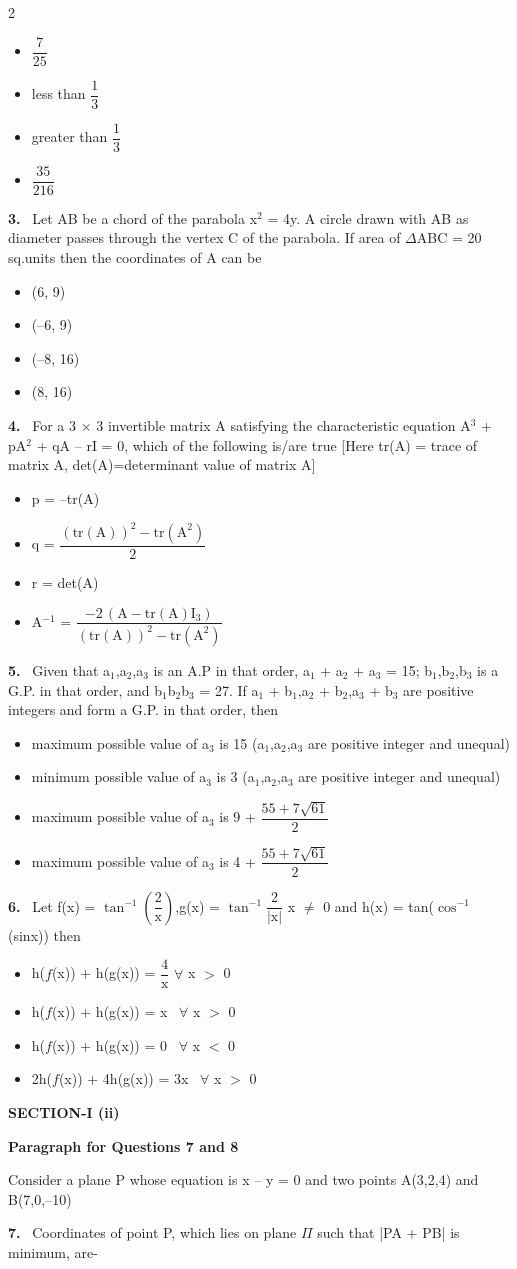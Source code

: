 \documentclass[10pt]{extarticle}
\newcommand{\sect}[1]{\par\smallskip\noindent\textbf{#1}\par}
\newcommand{\qn}[1]{\par\smallskip\noindent\textbf{#1.}~}
\newcommand{\paraq}[2]{\par\smallskip\noindent\textbf{Paragraph for Questions #1 and #2}\par}
\newenvironment{qoptions}{\begin{itemize}[leftmargin=1.8em,itemsep=1pt,topsep=2pt,label={}]}{\end{itemize}}
\newcommand{\opt}[2]{\item[(#1)] #2}
\begin{document}
\begin{multicols}{2}
\begin{qoptions}
\opt{A}{$\dfrac{7}{25}$}
\opt{B}{less than $\dfrac{1}{3}$}
\opt{C}{greater than $\dfrac{1}{3}$}
\opt{D}{$\dfrac{35}{216}$}
\end{qoptions}
\qn{3} Let AB be a chord of the parabola x$^2$ = 4y. A circle drawn with AB as diameter passes through the vertex C of the parabola. If area of $\Delta$ABC = 20 sq.units then the coordinates of A can be
\begin{qoptions}
\opt{A}{(6, 9)}
\opt{B}{(--6, 9)}
\opt{C}{(--8, 16)}
\opt{D}{(8, 16)}
\end{qoptions}
\qn{4} For a 3 $\times$ 3 invertible matrix A satisfying the characteristic equation A$^3$ + pA$^2$ + qA -- rI = 0, which of the following is/are true [Here tr(A) = trace of matrix A, det(A)=determinant value of matrix A]
\begin{qoptions}
\opt{A}{p = --tr(A)}
\opt{B}{q = $\dfrac{(\text{tr}(\text{A}))^2-\text{tr}(\text{A}^2)}{2}$}
\opt{C}{r = det(A)}
\opt{D}{A$^{-1}$ = $\dfrac{-2\,(\text{A}-\text{tr}(\text{A})\text{I}_3)}{(\text{tr}(\text{A}))^2-\text{tr}(\text{A}^2)}$}
\end{qoptions}
\qn{5} Given that a$_1$,a$_2$,a$_3$ is an A.P in that order, a$_1$ + a$_2$ + a$_3$ = 15; b$_1$,b$_2$,b$_3$ is a G.P. in that order, and b$_1$b$_2$b$_3$ = 27. If a$_1$ + b$_1$,a$_2$ + b$_2$,a$_3$ + b$_3$ are positive integers and form a G.P. in that order, then
\begin{qoptions}
\opt{A}{maximum possible value of a$_3$ is 15 (a$_1$,a$_2$,a$_3$ are positive integer and unequal)}
\opt{B}{minimum possible value of a$_3$ is 3 (a$_1$,a$_2$,a$_3$ are positive integer and unequal)}
\opt{C}{maximum possible value of a$_3$ is 9 + $\dfrac{55+7\sqrt{61}}{2}$}
\opt{D}{maximum possible value of a$_3$ is 4 + $\dfrac{55+7\sqrt{61}}{2}$}
\end{qoptions}
\qn{6} Let f(x) = $\tan^{-1}\!\left(\dfrac{2}{\text{x}}\right)$,g(x) = $\tan^{-1}\dfrac{2}{|\text{x}|}$ \quad x $\neq$ 0 and h(x) = tan($\cos^{-1}$(sinx)) then
\begin{qoptions}
\opt{A}{h($f$(x)) + h(g(x)) = $\dfrac{4}{\text{x}}$ $\forall$ x $>$ 0}
\opt{B}{h($f$(x)) + h(g(x)) = x \ $\forall$ x $>$ 0}
\opt{C}{h($f$(x)) + h(g(x)) = 0 \ $\forall$ x $<$ 0}
\opt{D}{2h($f$(x)) + 4h(g(x)) = 3x \ $\forall$ x $>$ 0}
\end{qoptions}
\sect{SECTION-I (ii)}
\paraq{7}{8}
Consider a plane P whose equation is x -- y = 0 and two points A(3,2,4) and B(7,0,--10)\par
\qn{7} Coordinates of point P, which lies on plane $\Pi$ such that |PA + PB| is minimum, are-

\end{multicols}
\end{document}
